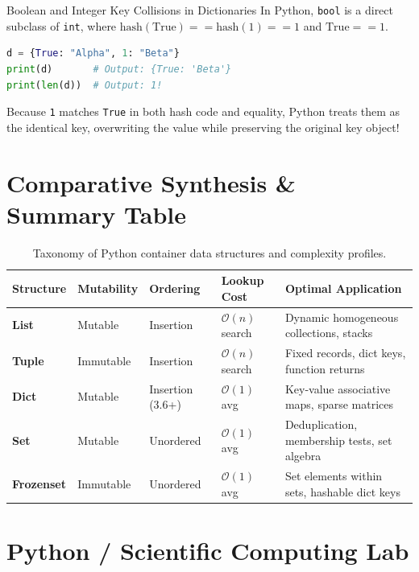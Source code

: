 \begin{trapbox}{Boolean and Integer Key Collisions in Dictionaries}
In Python, \texttt{bool} is a direct subclass of \texttt{int}, where $\text{hash}(\text{True}) == \text{hash}(1) == 1$ and $\text{True} == 1$.
\begin{lstlisting}[language=Python]
d = {True: "Alpha", 1: "Beta"}
print(d)       # Output: {True: 'Beta'}
print(len(d))  # Output: 1!
\end{lstlisting}
Because \texttt{1} matches \texttt{True} in both hash code and equality, Python treats them as the identical key, overwriting the value while preserving the original key object!
\end{trapbox}

\section{Comparative Synthesis \& Summary Table}

\begin{table}[htbp]
\centering
\small
\begin{tabular}{p{2.2cm} p{2.2cm} p{2.2cm} p{2.4cm} p{4.2cm}}
\hline
\textbf{Structure} & \textbf{Mutability} & \textbf{Ordering} & \textbf{Lookup Cost} & \textbf{Optimal Application} \\
\hline
\textbf{List} & Mutable & Insertion & $\mathcal{O}(n)$ search & Dynamic homogeneous collections, stacks \\
\textbf{Tuple} & Immutable & Insertion & $\mathcal{O}(n)$ search & Fixed records, dict keys, function returns \\
\textbf{Dict} & Mutable & Insertion (3.6+) & $\mathcal{O}(1)$ avg & Key-value associative maps, sparse matrices \\
\textbf{Set} & Mutable & Unordered & $\mathcal{O}(1)$ avg & Deduplication, membership tests, set algebra \\
\textbf{Frozenset} & Immutable & Unordered & $\mathcal{O}(1)$ avg & Set elements within sets, hashable dict keys \\
\hline
\end{tabular}
\caption{Taxonomy of Python container data structures and complexity profiles.}
\label{tab:container_taxonomy}
\end{table}

\section{Python / Scientific Computing Lab}

